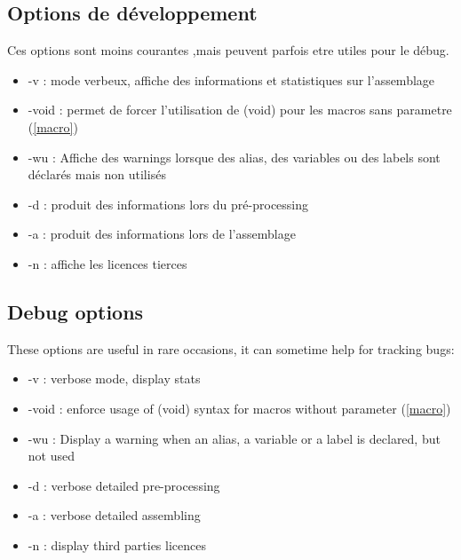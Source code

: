 \begin{xfr}
\subsection{Options de développement}
Ces options sont moins courantes ,mais peuvent parfois etre utiles pour le débug.
\begin{itemize}
\item -v : mode verbeux, affiche des informations et statistiques sur l'assemblage
\item -void : permet de forcer l'utilisation de (void) pour les macros sans parametre (\ref{macro})
\item -wu : Affiche des warnings lorsque des alias, des variables ou des labels sont déclarés mais non utilisés
\item -d : produit des informations lors du pré-processing
\item -a : produit des informations lors de l'assemblage
\item -n : affiche les licences tierces
\end{itemize}

\end{xfr}

\begin{xen}
\subsection{Debug options}
These options are useful in rare occasions, it can sometime help for tracking bugs:
\begin{itemize}
\item -v : verbose mode, display stats
\item -void : enforce usage of (void) syntax for macros without parameter (\ref{macro})
\item -wu : Display a warning when an alias, a variable or a label is declared, but not used
\item -d : verbose detailed pre-processing
\item -a : verbose detailed assembling
\item -n : display third parties licences
\end{itemize}

\end{xen}


